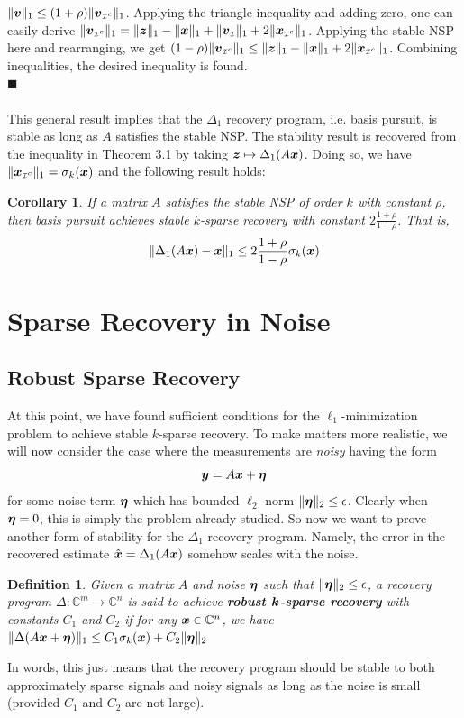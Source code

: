 \documentclass[twocolumn]{gwclass}
\newtheorem{corollary}{Corollary}[theorem]
\newtheorem{definition}{Definition}
\renewcommand\qedsymbol{$\blacksquare$}
\newcommand{\C}{\mathbb{C}}
\begin{document}
	$\|\boldsymbol{v}\|_1 \leq (1+\rho) \|\boldsymbol{v}_{\scriptscriptstyle\mathcal{I}^c}\|_1$. Applying the triangle inequality and adding zero, one can easily derive $ \|\boldsymbol{v}_{\scriptscriptstyle\mathcal{I}^c}\|_1= \|\boldsymbol{z}\|_1 - \|\boldsymbol{x}\|_1 + \|\boldsymbol{v}_{\scriptscriptstyle\mathcal{I}}\|_1 + 2\|\boldsymbol{x}_{\scriptscriptstyle\mathcal{I}^c}\|_1$. Applying the stable NSP here and rearranging, we get $ (1-\rho)\|\boldsymbol{v}_{\scriptscriptstyle\mathcal{I}^c}\|_1\leq \|\boldsymbol{z}\|_1 - \|\boldsymbol{x}\|_1 + 2\|\boldsymbol{x}_{\scriptscriptstyle\mathcal{I}^c}\|_1$. Combining inequalities, the desired inequality is found.
	\\
	\qedsymbol
	\\\\
	This general result implies that the $\Delta_1$ recovery program, i.e. basis pursuit, is stable as long as $A$ satisfies the stable NSP. The stability result is recovered from the inequality in Theorem 3.1 by taking $\boldsymbol{z}\mapsto \Delta_1(A\boldsymbol{x})$. Doing so, we have $\|\boldsymbol{x}_{\scriptscriptstyle\mathcal{I}^c}\|_1=\sigma_k(\boldsymbol{x})$ and the following result holds:
	\begin{corollary}
		If a matrix $A$ satisfies the stable NSP of order $k$ with constant $\rho$, then basis pursuit achieves stable $k$-sparse recovery with constant $2\frac{1+\rho}{1-\rho}$. That is,
		$$ \|\Delta_1(A\boldsymbol{x})-\boldsymbol{x}\|_1 \leq2\frac{1+\rho}{1-\rho}\sigma_k(\boldsymbol{x}) $$
	\end{corollary}

\section{Sparse Recovery in Noise}
	\subsection{Robust Sparse Recovery}
	At this point, we have found sufficient conditions for the $\ell_1$-minimization problem to achieve stable $k$-sparse recovery. To make matters more realistic, we will now consider the case where the measurements are \emph{noisy} having the form
	$$ \boldsymbol{y} = A\boldsymbol{x} + \boldsymbol{\eta} $$
	for some noise term $\boldsymbol{\eta}$ which has bounded $\ell_2$-norm $\|\boldsymbol{\eta}\|_2 \leq \epsilon$. Clearly when $\boldsymbol{\eta}=0$, this is simply the problem already studied. So now we want to prove another form of stability for the $\Delta_1$ recovery program. Namely, the error in the recovered estimate $\hat{\boldsymbol{x}}=\Delta_1(A\boldsymbol{x})$ somehow scales with the noise.

	\begin{definition}
		Given a matrix $A$ and noise $\boldsymbol{\eta}$ such that $\|\boldsymbol{\eta}\|_2\leq \epsilon$, a recovery program $\Delta:\C^m\to\C^n$ is said to achieve \textbf{robust $\boldsymbol{k}$-sparse recovery} with constants $C_1$ and $C_2$ if for any $\*x\in\C^n$, we have $\|\Delta(A\boldsymbol{x}+\boldsymbol{\eta})\|_1 \leq C_1 \sigma_k(\boldsymbol{x}) + C_2 \|\boldsymbol{\eta}\|_2$
	\end{definition}
	In words, this just means that the recovery program should be stable to both approximately sparse signals and noisy signals as long as the noise is small (provided $C_1$ and $C_2$ are not large).
		
\end{document}
